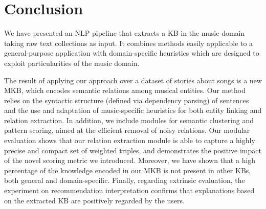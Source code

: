 \section{Conclusion}\label{sec:kb:conclusions}

We have presented an NLP pipeline that extracts a KB in the music domain taking raw text collections as input. It combines methods easily applicable to a general-purpose application with domain-specific heuristics which are designed to exploit particularities of the music domain.

The result of applying our approach over a dataset of stories about songs is a new MKB, which encodes semantic relations among musical entities. Our method relies on the syntactic structure (defined via dependency parsing) of sentences and the use and adaptation of music-specific heuristics for both entity linking and relation extraction. In addition, we include modules for semantic clustering and pattern scoring, aimed at the efficient removal of noisy relations. Our modular evaluation shows that our relation extraction module is able to capture a highly precise and compact set of weighted triples, and demonstrates the positive impact of the novel scoring metric we introduced. Moreover, we have shown that a high percentage of the knowledge encoded in our MKB is not present in other KBs, both general and domain-specific. Finally, regarding extrinsic evaluation, the experiment on recommendation interpretation confirms that explanations based on the extracted KB are positively regarded by the users.


